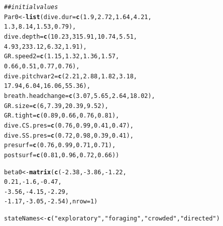 \documentclass[12pt]{article}\usepackage[]{graphicx}\usepackage[]{color}
\makeatletter
\newcommand{\hlnum}[1]{\textcolor[rgb]{0.686,0.059,0.569}{#1}}%
\newcommand{\hlstr}[1]{\textcolor[rgb]{0.192,0.494,0.8}{#1}}%
\newcommand{\hlcom}[1]{\textcolor[rgb]{0.678,0.584,0.686}{\textit{#1}}}%
\newcommand{\hlopt}[1]{\textcolor[rgb]{0,0,0}{#1}}%
\newcommand{\hlstd}[1]{\textcolor[rgb]{0.345,0.345,0.345}{#1}}%
\newcommand{\hlkwb}[1]{\textcolor[rgb]{0.69,0.353,0.396}{#1}}%
\newcommand{\hlkwc}[1]{\textcolor[rgb]{0.333,0.667,0.333}{#1}}%
\newcommand{\hlkwd}[1]{\textcolor[rgb]{0.737,0.353,0.396}{\textbf{#1}}}%
\newenvironment{kframe}{%
 \def\at@end@of@kframe{}%
 \ifinner\ifhmode%
  \def\at@end@of@kframe{\end{minipage}}%
  \begin{minipage}{\columnwidth}%
 \fi\fi%
 \def\FrameCommand##1{\hskip\@totalleftmargin \hskip-\fboxsep
 \colorbox{shadecolor}{##1}\hskip-\fboxsep
     \hskip-\linewidth \hskip-\@totalleftmargin \hskip\columnwidth}%
 \MakeFramed {\advance\hsize-\width
   \@totalleftmargin\z@ \linewidth\hsize
   \@setminipage}}%
 {\par\unskip\endMakeFramed%
 \at@end@of@kframe}
\newenvironment{knitrout}{}{} %
\makeatother
\begin{document}
\begin{knitrout}
\begin{kframe}
\begin{alltt}
\hlcom{## initial values}
\hlstd{Par0} \hlkwb{<-} \hlkwd{list}\hlstd{(}\hlkwc{dive.dur} \hlstd{=} \hlkwd{c}\hlstd{(}\hlnum{1.9}\hlstd{,} \hlnum{2.72}\hlstd{,} \hlnum{1.64}\hlstd{,} \hlnum{4.21}\hlstd{,}
                          \hlnum{1.3}\hlstd{,} \hlnum{8.14}\hlstd{,} \hlnum{1.53}\hlstd{,} \hlnum{0.79}\hlstd{),}
             \hlkwc{dive.depth} \hlstd{=} \hlkwd{c}\hlstd{(}\hlnum{10.23}\hlstd{,} \hlnum{315.91}\hlstd{,} \hlnum{10.74}\hlstd{,} \hlnum{5.51}\hlstd{,}
                             \hlnum{4.93}\hlstd{,} \hlnum{233.12}\hlstd{,}  \hlnum{6.32}\hlstd{,} \hlnum{1.91}\hlstd{),}
             \hlkwc{GR.speed2} \hlstd{=} \hlkwd{c}\hlstd{(}\hlnum{1.15}\hlstd{,} \hlnum{1.32}\hlstd{,} \hlnum{1.36}\hlstd{,} \hlnum{1.57}\hlstd{,}
                           \hlnum{0.66}\hlstd{,} \hlnum{0.51}\hlstd{,} \hlnum{0.77}\hlstd{,} \hlnum{0.76}\hlstd{),}
             \hlkwc{dive.pitchvar2} \hlstd{=} \hlkwd{c}\hlstd{(} \hlnum{2.21}\hlstd{,} \hlnum{2.88}\hlstd{,}  \hlnum{1.82}\hlstd{,}  \hlnum{3.18}\hlstd{,}
                                \hlnum{17.94}\hlstd{,} \hlnum{6.04}\hlstd{,} \hlnum{16.06}\hlstd{,} \hlnum{55.36}\hlstd{),}
             \hlkwc{breath.headchange} \hlstd{=} \hlkwd{c}\hlstd{(}\hlnum{3.07}\hlstd{,} \hlnum{5.65}\hlstd{,} \hlnum{2.64}\hlstd{,} \hlnum{18.02}\hlstd{),}
             \hlkwc{GR.size} \hlstd{=} \hlkwd{c}\hlstd{(}\hlnum{6}\hlstd{,} \hlnum{7.39}\hlstd{,} \hlnum{20.39}\hlstd{,} \hlnum{9.52}\hlstd{),}
             \hlkwc{GR.tight} \hlstd{=} \hlkwd{c}\hlstd{(}\hlnum{0.89}\hlstd{,} \hlnum{0.66}\hlstd{,} \hlnum{0.76}\hlstd{,} \hlnum{0.81}\hlstd{),}
             \hlkwc{dive.CS.pres} \hlstd{=} \hlkwd{c}\hlstd{(}\hlnum{0.76}\hlstd{,} \hlnum{0.99}\hlstd{,} \hlnum{0.41}\hlstd{,} \hlnum{0.47}\hlstd{),}
             \hlkwc{dive.SS.pres} \hlstd{=} \hlkwd{c}\hlstd{(}\hlnum{0.72}\hlstd{,} \hlnum{0.98}\hlstd{,} \hlnum{0.39}\hlstd{,} \hlnum{0.41}\hlstd{),}
             \hlkwc{presurf} \hlstd{=} \hlkwd{c}\hlstd{(}\hlnum{0.76}\hlstd{,} \hlnum{0.99}\hlstd{,} \hlnum{0.71}\hlstd{,} \hlnum{0.71}\hlstd{),}
             \hlkwc{postsurf} \hlstd{=} \hlkwd{c}\hlstd{(}\hlnum{0.81}\hlstd{,} \hlnum{0.96}\hlstd{,} \hlnum{0.72}\hlstd{,} \hlnum{0.66}\hlstd{))}

\hlstd{beta0} \hlkwb{<-} \hlkwd{matrix}\hlstd{(}\hlkwd{c}\hlstd{(}\hlopt{-}\hlnum{2.38}\hlstd{,} \hlopt{-}\hlnum{3.86}\hlstd{,} \hlopt{-}\hlnum{1.22}\hlstd{,}
                   \hlnum{0.21}\hlstd{,}  \hlopt{-}\hlnum{1.6}\hlstd{,} \hlopt{-}\hlnum{0.47}\hlstd{,}
                  \hlopt{-}\hlnum{3.56}\hlstd{,} \hlopt{-}\hlnum{4.15}\hlstd{,} \hlopt{-}\hlnum{2.29}\hlstd{,}
                  \hlopt{-}\hlnum{1.17}\hlstd{,} \hlopt{-}\hlnum{3.05}\hlstd{,} \hlopt{-}\hlnum{2.54}\hlstd{),}\hlkwc{nrow}\hlstd{=}\hlnum{1}\hlstd{)}

\hlstd{stateNames} \hlkwb{<-} \hlkwd{c}\hlstd{(}\hlstr{"exploratory"}\hlstd{,}\hlstr{"foraging"}\hlstd{,}\hlstr{"crowded"}\hlstd{,}\hlstr{"directed"}\hlstd{)}
\end{alltt}
\end{kframe}
\end{knitrout}
\end{document}
